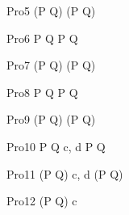 \begin{circus}
    \circprocess Pro5 \circdef (P \circtimeout {} \rcirctime Q) \extchoice (P \circtimeout {} \rcirctime Q) \\
\end{circus}


\begin{circus}
    \circprocess Pro6 \circdef P \circtimeout {} \rcirctime Q \intchoice P \circtimeout {} \rcirctime Q \\
\end{circus}
    
\begin{circus}
    \circprocess Pro7 \circdef (P \circtimeout {} \rcirctime Q) \intchoice (P \circtimeout {} \rcirctime Q) \\
\end{circus}
    
\begin{circus}
    \circprocess Pro8 \circdef P \circtimeout {} \rcirctime  Q \interleave P \circtimeout {} \rcirctime Q \\
\end{circus}

\begin{circus}
    \circprocess Pro9 \circdef (P \circtimeout {} \rcirctime Q) \interleave (P \circtimeout {} \rcirctime Q) \\
\end{circus}



\begin{circus}
    \circprocess Pro10 \circdef P \circtimeout {} \rcirctime  Q \lpar  \lchanset c, d \rchanset  \rpar  P \circtimeout {} \rcirctime Q \\
\end{circus}

\begin{circus}
    \circprocess Pro11 \circdef (P \circtimeout {} \rcirctime Q) \lpar  \lchanset c, d \rchanset  \rpar (P \circtimeout {} \rcirctime Q) \\
\end{circus}


\begin{circus}
    \circprocess Pro12 \circdef (P \circtimeout {} \rcirctime Q) \circhide c \\
\end{circus} 


